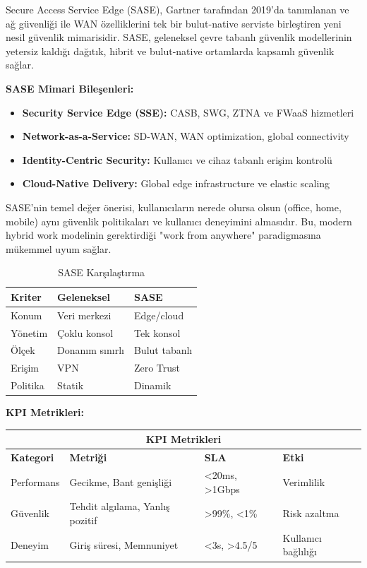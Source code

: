 Secure Access Service Edge (SASE), Gartner tarafından 2019'da tanımlanan ve ağ güvenliği ile WAN özelliklerini tek bir bulut-native serviste birleştiren yeni nesil güvenlik mimarisidir. SASE, geleneksel çevre tabanlı güvenlik modellerinin yetersiz kaldığı dağıtık, hibrit ve bulut-native ortamlarda kapsamlı güvenlik sağlar.

\textbf{SASE Mimari Bileşenleri:}
\begin{itemize}
    \item \textbf{Security Service Edge (SSE):} CASB, SWG, ZTNA ve FWaaS hizmetleri
    \item \textbf{Network-as-a-Service:} SD-WAN, WAN optimization, global connectivity
    \item \textbf{Identity-Centric Security:} Kullanıcı ve cihaz tabanlı erişim kontrolü
    \item \textbf{Cloud-Native Delivery:} Global edge infrastructure ve elastic scaling
\end{itemize}

SASE'nin temel değer önerisi, kullanıcıların nerede olursa olsun (office, home, mobile) aynı güvenlik politikaları ve kullanıcı deneyimini almasıdır. Bu, modern hybrid work modelinin gerektirdiği "work from anywhere" paradigmasına mükemmel uyum sağlar.

\begin{table}[H]
\centering
\caption*{SASE Karşılaştırma}
\small
\begin{tabularx}{\linewidth}{|>{\hsize=0.8\hsize}X|>{\hsize=1.1\hsize}X|>{\hsize=1.1\hsize}X|}
\hline
\textbf{Kriter} & \textbf{Geleneksel} & \textbf{SASE} \\
\hline
Konum & Veri merkezi & Edge/cloud \\
\hline
Yönetim & Çoklu konsol & Tek konsol \\
\hline
Ölçek & Donanım sınırlı & Bulut tabanlı \\
\hline
Erişim & VPN & Zero Trust \\
\hline
Politika & Statik & Dinamik \\
\hline
\end{tabularx}
\end{table}

\textbf{KPI Metrikleri:}
\begin{adjustbox}{max width=\textwidth}
\small
\begin{tabularx}{\textwidth}{|p{2.5cm}|p{3cm}|p{2cm}|p{2cm}|}
\hline
\multicolumn{4}{|c|}{\textbf{KPI Metrikleri}} \\
\hline
\textbf{Kategori} & \textbf{Metriği} & \textbf{SLA} & \textbf{Etki} \\
\hline
Performans & Gecikme, Bant genişliği & <20ms, >1Gbps & Verimlilik \\
\hline
Güvenlik & Tehdit algılama, Yanlış pozitif & >99\%, <1\% & Risk azaltma \\
\hline
Deneyim & Giriş süresi, Memnuniyet & <3s, >4.5/5 & Kullanıcı bağlılığı \\
\hline
\end{tabularx}
\end{adjustbox}


